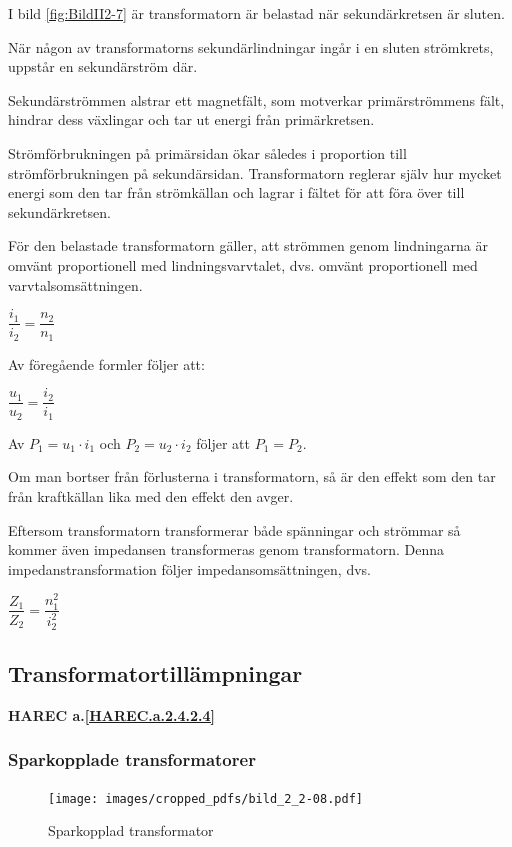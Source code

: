 I bild \ref{fig:BildII2-7} är transformatorn är belastad när sekundärkretsen
är sluten.

När någon av transformatorns sekundärlindningar ingår i en sluten strömkrets,
uppstår en sekundärström där.

Sekundärströmmen alstrar ett magnetfält, som motverkar primärströmmens fält,
hindrar dess växlingar och tar ut energi från primärkretsen.

Strömförbrukningen på primärsidan ökar således i proportion till
strömförbrukningen på sekundärsidan. Transformatorn reglerar själv hur mycket
energi som den tar från strömkällan och lagrar i fältet för att föra över
till sekundärkretsen.

För den belastade transformatorn gäller, att strömmen genom lindningarna är
omvänt proportionell med lindningsvarvtalet, dvs. omvänt proportionell med
varvtalsomsättningen.

\(\dfrac{i_1}{i_2} = \dfrac{n_2}{n_1}\)

Av föregående formler följer att:

\(\dfrac{u_1}{u_2} = \dfrac{i_2}{i_1}\)

Av \(P_1 = u_1 \cdot i_1\) och \(P_2 = u_2 \cdot i_2\) följer att \(P_1 = P_2\).

Om man bortser från förlusterna i transformatorn, så är den effekt som den tar
från kraftkällan lika med den effekt den avger.

Eftersom transformatorn transformerar både spänningar och strömmar så kommer
även impedansen transformeras genom transformatorn.
Denna impedanstransformation följer impedansomsättningen, dvs.

\(\dfrac{Z_1}{Z_2} = \dfrac{n_1^2}{i_2^2}\)

\subsection{Transformatortillämpningar}
\textbf{HAREC a.\ref{HAREC.a.2.4.2.4}\label{myHAREC.a.2.4.2.4}}

\subsubsection{Sparkopplade transformatorer}

\begin{figure}[ht]
\begin{center}
\texttt{[image: images/cropped\_pdfs/bild\_2\_2-08.pdf]}
\caption{Sparkopplad transformator}
\label{fig:BildII2-8}
\end{center}
\end{figure}

